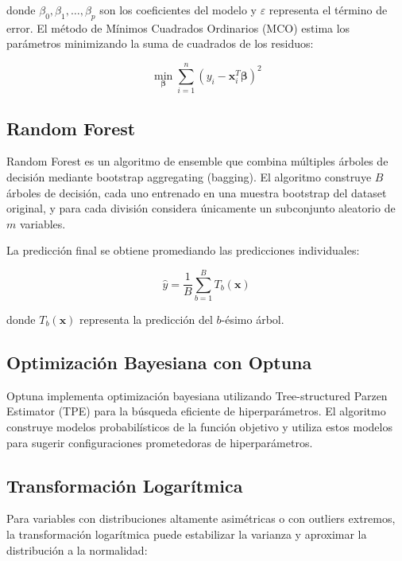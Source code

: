 \documentclass[12pt,a4paper]{article}
\begin{document}
donde $\beta_0, \beta_1, \ldots, \beta_p$ son los coeficientes del modelo y $\varepsilon$ representa el término de error. El método de Mínimos Cuadrados Ordinarios (MCO) estima los parámetros minimizando la suma de cuadrados de los residuos:

\begin{equation}
\min_{\boldsymbol{\beta}} \sum_{i=1}^{n} (y_i - \boldsymbol{x}_i^T \boldsymbol{\beta})^2
\end{equation}

\subsection{Random Forest}

Random Forest \cite{breiman2001} es un algoritmo de ensemble que combina múltiples árboles de decisión mediante bootstrap aggregating (bagging). El algoritmo construye $B$ árboles de decisión, cada uno entrenado en una muestra bootstrap del dataset original, y para cada división considera únicamente un subconjunto aleatorio de $m$ variables.

La predicción final se obtiene promediando las predicciones individuales:

\begin{equation}
\hat{y} = \frac{1}{B} \sum_{b=1}^{B} T_b(\boldsymbol{x})
\end{equation}

donde $T_b(\boldsymbol{x})$ representa la predicción del $b$-ésimo árbol.

\subsection{Optimización Bayesiana con Optuna}

Optuna \cite{akiba2019} implementa optimización bayesiana utilizando Tree-structured Parzen Estimator (TPE) para la búsqueda eficiente de hiperparámetros. El algoritmo construye modelos probabilísticos de la función objetivo y utiliza estos modelos para sugerir configuraciones prometedoras de hiperparámetros.

\subsection{Transformación Logarítmica}

Para variables con distribuciones altamente asimétricas o con outliers extremos, la transformación logarítmica puede estabilizar la varianza y aproximar la distribución a la normalidad:
\end{document}
